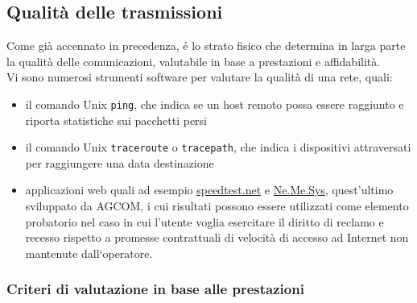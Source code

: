 \documentclass[a4paper,11pt]{article}
\def\code#1{\texttt{#1}}
\def\subsub#1{\subsubsection{#1}\label{#1}}
\begin{document}
\subsection{Qualità delle trasmissioni} \label{qualita}
Come già accennato in precedenza, é lo strato fisico che determina in larga parte la qualità delle comunicazioni, valutabile in base a prestazioni e affidabilità. 
\\Vi sono numerosi strumenti software per valutare la qualità di una rete, quali:
\begin{itemize}
\item il comando Unix \code{ping}, che indica se un host remoto possa essere raggiunto e riporta statistiche sui pacchetti persi 
\item il comando Unix \code{traceroute} o \code{tracepath}, che indica i dispositivi attraversati per raggiungere una data destinazione
\item applicazioni web quali ad esempio \url{speedtest.net} e \href{<https://www.misurainternet.it/>}{Ne.Me.Sys}, quest'ultimo sviluppato da AGCOM, i cui risultati possono essere utilizzati come elemento probatorio nel caso in cui l’utente voglia esercitare il diritto di reclamo e recesso rispetto a promesse contrattuali di velocità di accesso ad Internet non mantenute dall‘operatore.
\end{itemize}
\subsub{Criteri di valutazione in base alle prestazioni}
\end{document}
